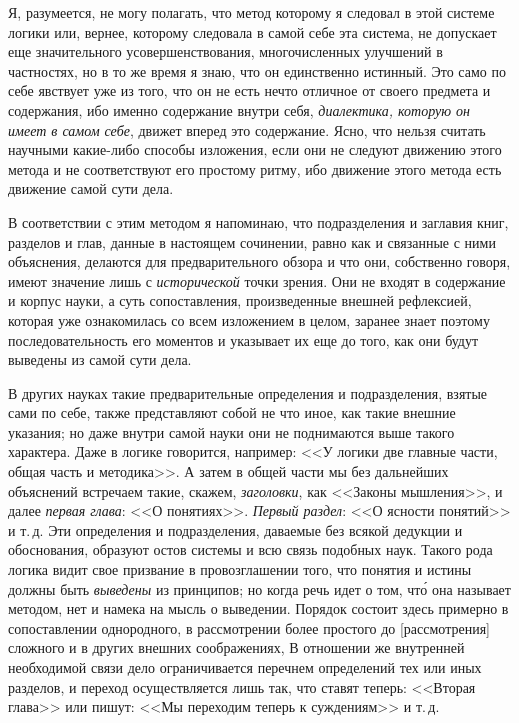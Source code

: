 
Я, разумеется, не могу полагать, что метод которому
я следовал в этой системе логики или, вернее, которому
следовала в самой себе эта система, не допускает
еще значительного усовершенствования, многочисленных
улучшений в частностях, но в то же время я знаю, что
он единственно истинный. Это само по себе явствует уже
из того, что он не есть нечто отличное от своего предмета
и содержания, ибо именно содержание внутри себя,
\emph{диалектика, которую он имеет в самом себе}, движет вперед
это содержание. Ясно, что нельзя считать научными
какие-либо способы изложения, если они не следуют движению
этого метода и не соответствуют его простому
ритму, ибо движение этого метода есть движение самой
сути дела.

В соответствии с этим методом я напоминаю, что
подразделения и заглавия книг, разделов и глав, данные
в настоящем сочинении, равно как и связанные с ними
объяснения, делаются для предварительного обзора и что
они, собственно говоря, имеют значение лишь с \emph{исторической}
точки зрения. Они не входят в содержание и корпус
науки, а суть сопоставления, произведенные внешней
рефлексией, которая уже ознакомилась со всем изложением
в целом, заранее знает поэтому последовательность
его моментов и указывает их еще до того, как они будут
выведены из самой сути дела.

В других науках такие предварительные определения
и подразделения, взятые сами по себе, также представляют
собой не что иное, как такие внешние указания;
но даже внутри самой науки они не поднимаются выше
такого характера. Даже в логике говорится, например:
<<У логики две главные части, общая часть и методика>>.
А затем в общей части мы без дальнейших объяснений
встречаем такие, скажем, \emph{заголовки}, как <<Законы мышления>>,
и далее \emph{первая глава}: <<О понятиях>>. \emph{Первый раздел}:
<<О ясности понятий>> и т.\,д. Эти определения и подразделения,
даваемые без всякой дедукции и обоснования,
образуют остов системы и всю связь подобных наук.
Такого рода логика видит свое призвание в провозглашении
того, что понятия и истины должны быть \emph{выведены}
из принципов; но когда речь идет о том, чт\'о она
называет методом, нет и намека на мысль о выведении.
Порядок состоит здесь примерно в сопоставлении однородного,
в рассмотрении более простого до [рассмотрения]
сложного и в других внешних соображениях, В отношении
же внутренней необходимой связи дело ограничивается
перечнем определений тех или иных разделов, и
переход осуществляется лишь так, что ставят теперь:
<<Вторая глава>> или пишут: <<Мы переходим теперь
к суждениям>> и т.\,д.

